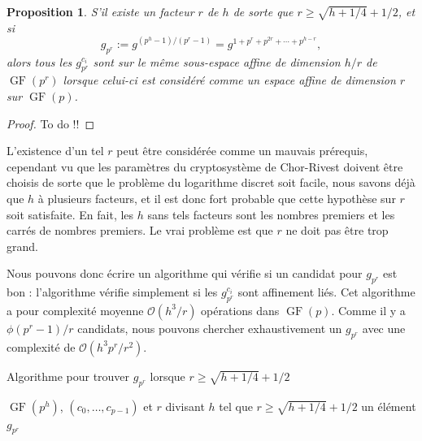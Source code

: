 \documentclass[a4paper, titlepage]{article}
\newtheorem{prop}[theo]{Proposition}
\theoremstyle{definition}
\theoremstyle{remark}
\def\O{\mathcal O}
\def\gf{\operatorname{GF}}
\begin{document}
\begin{prop}
S'il existe un facteur $r$ de $h$ de sorte que $r \geqslant \sqrt{h + 1/4} + 1/2$, et si $$g_{p^r} := g^{(p^h-1)/(p^r-1)} = g^{1+p^r+p^{2r}+\cdots+p^{h-r}},$$ alors tous les $g_{p^r}^{c_i}$ sont sur le même sous-espace affine de dimension $h/r$ de $\gf(p^r)$ lorsque celui-ci est considéré comme un espace affine de dimension $r$ sur $\gf(p)$.
\end{prop}

\begin{proof}
To do !!
\end{proof}

L'existence d'un tel $r$ peut être considérée comme un mauvais prérequis, cependant vu que les paramètres du cryptosystème de Chor-Rivest doivent être choisis de sorte que le problème du logarithme discret soit facile, nous savons déjà que $h$ à plusieurs facteurs, et il est donc fort probable que cette hypothèse sur $r$ soit satisfaite. En fait, les $h$ sans tels facteurs sont les nombres premiers et les carrés de nombres premiers. Le vrai problème est que $r$ ne doit pas être trop grand.

Nous pouvons donc écrire un algorithme qui vérifie si un candidat pour $g_{p^r}$ est bon : l'algorithme vérifie simplement si les $g_{p^r}^{c_i}$ sont affinement liés. Cet algorithme a pour complexité moyenne $\O(h^3/r)$ opérations dans $\gf(p)$. Comme il y a $\phi(p^r-1)/r$ candidats, nous pouvons chercher exhaustivement un $g_{p^r}$ avec une complexité de $\O(h^3p^r/r^2)$.

\begin{algorithm}[h]
\caption{Algorithme pour trouver $g_{p^r}$ lorsque $r\geqslant \sqrt{h + 1/4} + 1/2$}
\label{algoTestgpr}
\begin{algorithmic}[1]
\REQUIRE $\gf(p^h)$, $(c_0,\dots, c_{p-1})$ et $r$ divisant $h$ tel que $r\geqslant \sqrt{h + 1/4} + 1/2$
\ENSURE un élément $g_{p^r}$
\FORALL{$\zeta \in \gf(p^h)$ générateur de $\gf(p^r)^\times$} \label{algoTestgprboucle}
		\ENDIF
	\ENDFOR
	\RETURN{$\zeta$}
\ENDFOR
\end{algorithmic}
\end{algorithm}
\end{document}
